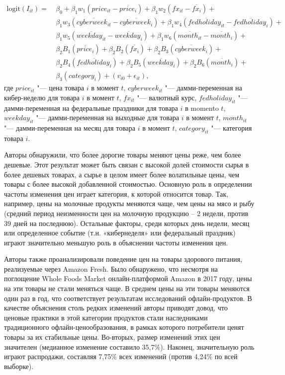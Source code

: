 \begin{align}
	\label{eq:equation23}
	\text{logit}(I_{it}) = & \ \beta_0 + \beta_1 w_1 \left( price_{it} - \overline{price_i} \right) + \beta_1 w_2 \left( fx_{it} - \overline{fx_i} \right) +  \nonumber \\
	& \ \beta_1 w_3 \left( \overline{cyberweek_{it}} - \overline{cyberweek_i} \right) + \beta_1 w_4 \left( \overline{fedholiday_{it}} - \overline{fedholiday_i} \right) + \nonumber \\
	& \ \beta_1 w_5 \left( \overline{weekday_{it}} - \overline{weekday_i} \right) + \beta_1 w_6 \left( \overline{month_{it}} - \overline{month_i} \right) + \nonumber \\
	& \ \beta_2 B_1 \left( \overline{price_i} \right) + \beta_2 B_2 \left( \overline{fx_i} \right) + \beta_2 B_3 \left( \overline{cyberweek_i} \right) + \nonumber \\
	& \ \beta_2 B_4 \left( \overline{fedholiday_i} \right) + \beta_2 B_5 \left( \overline{weekday_i} \right) + \beta_2 B_6 \left( \overline{month_i} \right) + \nonumber \\
	& \ \beta_3 \left( category_i \right) + \left(v_{i0} + \epsilon_{it}\right),
\end{align}
где \( price_{it} \) "--- цена товара $i$ в момент $t$, \( cyberweek_{it} \) "--- дамми-переменная на кибер-неделю для товара $i$ в момент $t$, \( fx_{it} \) "--- валютный курс, \( fedholiday_{it} \) "--- дамми-переменная на федеральные праздники для товара $i$ в momento $t$, \( weekday_{it} \) "--- дамми-переменная на выходные для товара $i$ в момент $t$, \( month_{it} \) "--- дамми-переменная на месяц для товара  $i$ в момент $t$, \( category_{it} \) "--- категория товара $i$.

Авторы обнаружили, что более дорогие товары меняют цены реже, чем более дешевые. Этот результат может быть связан с высокой долей стоимости сырья в более дешевых товарах, а сырье в целом имеет более волатильные цены, чем товары с более высокой добавленной стоимостью. Основную роль в определении частоты изменения цен играет категория, к которой относится товар. Так, например, цены на молочные продукты меняются чаще, чем цены на мясо и рыбу (средний период неизменности цен на молочную продукцию – 2 недели, против 39 дней на последнюю). Остальные факторы, среди которых день недели, месяц или определенное событие (т.н. «кибернеделя» или федеральный праздник) играют значительно меньшую роль в объяснении частоты изменения цен.

Авторы также проанализировали поведение цен на товары здорового питания, реализуемые через Amazon Fresh. Было обнаружено, что несмотря на поглощение Whole Foods Market онлайн-платформой Amazon в 2017 году, цены на эти товары не стали меняться чаще. В среднем цены на эти товары меняются один раз в год, что соответствует результатам исследований офлайн-продуктов. В качестве объяснения столь редких изменений авторы приводят довод, что ценовые практики в этой категории продуктов стали наследниками традиционного офлайн-ценообразования, в рамках которого потребители ценят товары за их стабильные цены. Во-вторых, размер изменений этих цен значителен (медианное изменение составило 35,7\%). Наконец, значительную роль играют распродажи, составляя 7,75\% всех изменений (против 4,24\% по всей выборке).

